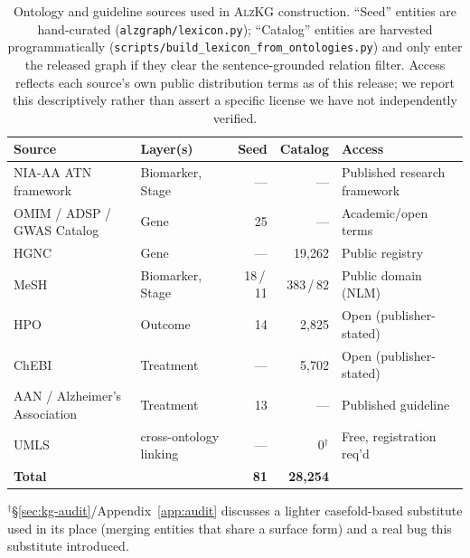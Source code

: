 \documentclass{article}
\begin{document}
\begin{table}[h]
\centering
\caption{Ontology and guideline sources used in \textsc{AlzKG} construction. ``Seed'' entities are hand-curated (\texttt{alzgraph/lexicon.py}); ``Catalog'' entities are harvested programmatically (\texttt{scripts/build\_lexicon\_from\_ontologies.py}) and only enter the released graph if they clear the sentence-grounded relation filter. Access reflects each source's own public distribution terms as of this release; we report this descriptively rather than assert a specific license we have not independently verified.}
\label{tab:ontology-sources}
\small
\begin{tabular}{p{3.6cm}p{2.1cm}rrp{2.9cm}}
\toprule
\textbf{Source} & \textbf{Layer(s)} & \textbf{Seed} & \textbf{Catalog} & \textbf{Access} \\
\midrule
NIA-AA ATN framework~\citep{jack2018nia} & Biomarker, Stage & --- & --- & Published research framework \\
OMIM / ADSP / GWAS Catalog~\citep{bellenguez2022gwas,lambert2013igap} & Gene & 25 & --- & Academic/open terms \\
HGNC & Gene & --- & 19{,}262 & Public registry \\
MeSH & Biomarker, Stage & 18\,/\,11 & 383\,/\,82 & Public domain (NLM) \\
HPO~\citep{kohler2021hpo} & Outcome & 14 & 2{,}825 & Open (publisher-stated) \\
ChEBI~\citep{hastings2016chebi} & Treatment & --- & 5{,}702 & Open (publisher-stated) \\
AAN / Alzheimer's Association~\citep{cummings2023auc} & Treatment & 13 & --- & Published guideline \\
UMLS~\citep{bodenreider2004umls} & cross-ontology linking & --- & 0$^{\dagger}$ & Free, registration req'd \\
\midrule
\textbf{Total} & & \textbf{81} & \textbf{28{,}254} & \\
\bottomrule
\end{tabular}

\vspace{4pt}
\footnotesize $^{\dagger}$\S\ref{sec:kg-audit}/Appendix~\ref{app:audit} discusses a lighter casefold-based substitute used in its place (merging entities that share a surface form) and a real bug this substitute introduced.
\end{table}
\end{document}
